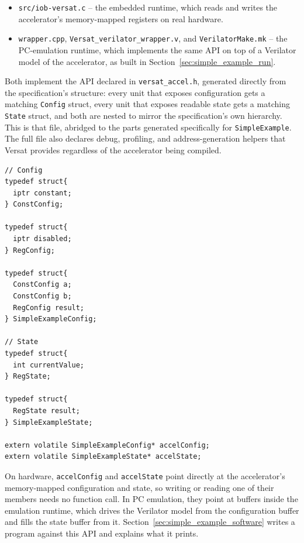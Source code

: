 \begin{itemize}
  \itemsep-0.5em
  \item \texttt{src/iob-versat.c} -- the embedded runtime, which reads and writes the accelerator's memory-mapped registers on real hardware.
  \item \texttt{wrapper.cpp}, \texttt{Versat\_verilator\_wrapper.v}, and \texttt{VerilatorMake.mk} -- the PC-emulation runtime, which implements the same API on top of a Verilator model of the accelerator, as built in Section~\ref{sec:simple_example_run}.
\end{itemize}

Both implement the API declared in \texttt{versat\_accel.h}, generated directly from the specification's structure: every unit that exposes configuration gets a matching \texttt{Config} struct, every unit that exposes readable state gets a matching \texttt{State} struct, and both are nested to mirror the specification's own hierarchy. This is that file, abridged to the parts generated specifically for \texttt{SimpleExample}. The full file also declares debug, profiling, and address-generation helpers that Versat provides regardless of the accelerator being compiled.

\begin{lstlisting}[caption={versat\_accel.h}]
// Config
typedef struct{
  iptr constant;
} ConstConfig;

typedef struct{
  iptr disabled;
} RegConfig;

typedef struct{
  ConstConfig a;
  ConstConfig b;
  RegConfig result;
} SimpleExampleConfig;

// State
typedef struct{
  int currentValue;
} RegState;

typedef struct{
  RegState result;
} SimpleExampleState;

extern volatile SimpleExampleConfig* accelConfig;
extern volatile SimpleExampleState* accelState;
\end{lstlisting}

On hardware, \texttt{accelConfig} and \texttt{accelState} point directly at the accelerator's memory-mapped configuration and state, so writing or reading one of their members needs no function call. In PC emulation, they point at buffers inside the emulation runtime, which drives the Verilator model from the configuration buffer and fills the state buffer from it. Section~\ref{sec:simple_example_software} writes a program against this API and explains what it prints.
